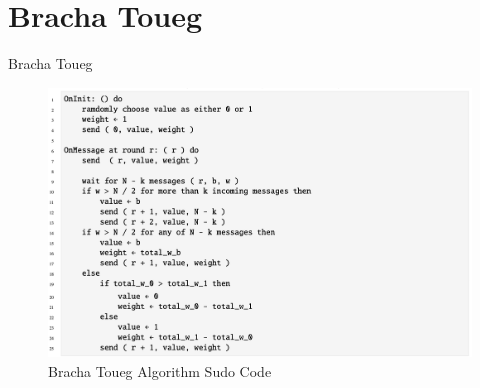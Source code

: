 \documentclass[11pt]{beamer}              %
\begin{document}
\section{Bracha Toueg}
\begin{frame}{Bracha Toueg}
\begin{figure}
    \centering
    \includegraphics[scale=0.4]{bracha-toueg.png}
    \caption{Bracha Toueg Algorithm Sudo Code}
    \label{fig:bracha_toueg_sudo}
\end{figure}



\end{frame}
\end{document}
